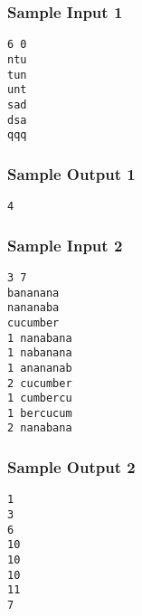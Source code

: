 \subsubsection{Sample Input 1}\label{sample-input-1}
\begin{verbatim}
6 0
ntu
tun
unt
sad
dsa
qqq
\end{verbatim}

\subsubsection{Sample Output 1}\label{sample-output-1}
\begin{verbatim}
4
\end{verbatim}

\subsubsection{Sample Input 2}\label{sample-input-2}
\begin{verbatim}
3 7
bananana
nananaba
cucumber
1 nanabana
1 nabanana
1 anananab
2 cucumber
1 cumbercu
1 bercucum
2 nanabana
\end{verbatim}

\subsubsection{Sample Output 2}\label{sample-output-2}
\begin{verbatim}
1
3
6
10
10
10
11
7
\end{verbatim}